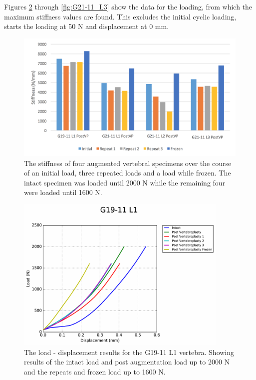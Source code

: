 Figures \ref{fig:G19-11_L1} through \ref{fig:G21-11_L3} show the data for the
loading, from which the maximum stiffness values are found. This excludes the
initial cyclic loading, starts the loading at 50 N and displacement at 0 mm.

\begin{figure}[!h]
  \centering
  \includegraphics[width=6in]{Chapters/Chapter_HT_images/experimental_repeats.png}
  \caption{The stiffness of four augmented vertebral specimens over the course
    of an initial load, three repeated loads and a load while frozen. The intact
    specimen was loaded until 2000 N while the remaining four were loaded until
    1600 N.}
  \label{fig:exp_repeats}
\end{figure}


\begin{figure}[ht!]
  \centering
  \includegraphics[width=4in]{Chapters/Chapter_HT_images/G19-11_L1.pdf}
  \caption{The load - displacement results for the G19-11 L1 vertebra. Showing
    results of the intact load and post augmentation load up to 2000 N and the
    repeats and frozen load up to 1600 N.}
  \label{fig:G19-11_L1}
\end{figure}

